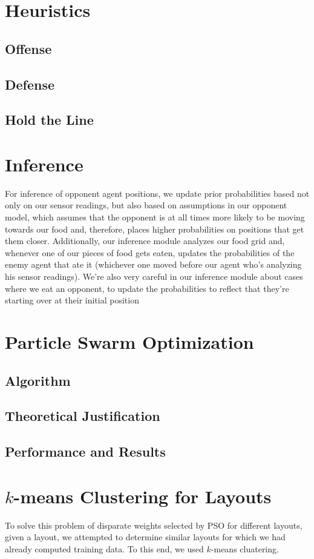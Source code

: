\documentclass[12pt]{article}
\begin{document}
\section{Heuristics}
\subsection{Offense}
\subsection{Defense}
\subsection{Hold the Line}

\section{Inference}
For inference of opponent agent positions, we update prior probabilities based not only on our sensor readings, but also based on assumptions in our opponent model, which assumes that the opponent is at all times more likely to be moving towards our food and, therefore, places higher probabilities on positions that get them closer. Additionally, our inference module analyzes our food grid and, whenever one of our pieces of food gets eaten, updates the probabilities of the enemy agent that ate it (whichever one moved before our agent who's analyzing his sensor readings). We're also very careful in our inference module about cases where we eat an opponent, to update the probabilities to reflect that they're starting over at their initial position 
\section{Particle Swarm Optimization}
\subsection{Algorithm}
\subsection{Theoretical Justification}
\subsection{Performance and Results}

\section{$k$-means Clustering for Layouts}
To solve this problem of disparate weights selected by PSO for different
layouts, given a layout, we attempted to determine similar layouts for
which we had already computed training data.  To this end, we used
$k$-means cluatering.
\end{document}
